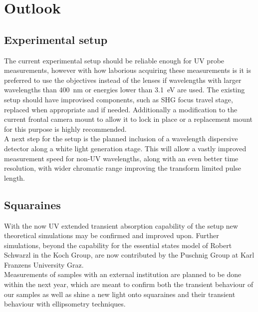 \documentclass[twoside,openright,listof=numbered]{scrreprt}
\begin{document}
\chapter{Outlook}
\section{Experimental setup}
The current experimental setup should be reliable enough for UV probe measurements, however with how laborious acquiring these measurements is it is preferred to use the objectives instead of the lenses if wavelengths with larger wavelengths than \qty{400}{\nano\meter} or energies lower than \qty{3.1}{\electronvolt} are used. The existing setup should have improvised components, such as SHG focus travel stage, replaced when appropriate and if needed. Additionally a modification to the current frontal camera mount to allow it to lock in place or a replacement mount for this purpose is highly recommended.\\
A next step for the setup is the planned inclusion of a wavelength dispersive detector along a white light generation stage. This will allow a vastly improved measurement speed for non-UV wavelengths, along with an even better time resolution, with wider chromatic range improving the transform limited pulse length.

\section{Squaraines}
With the now UV extended transient absorption capability of the setup new theoretical simulations may be confirmed and improved upon. Further simulations, beyond the capability for the essential states model of Robert Schwarzl in the Koch Group, are now contributed by the Puschnig Group at Karl Franzens University Graz.\\
Measurements of samples with an external institution are planned to be done within the next year, which are meant to confirm both the transient behaviour of our samples as well as shine a new light onto squaraines and their transient behaviour with ellipsometry techniques.


\setcounter{chapter}{0}
\renewcommand\thechapter{\Alph{chapter}}
\end{document}
